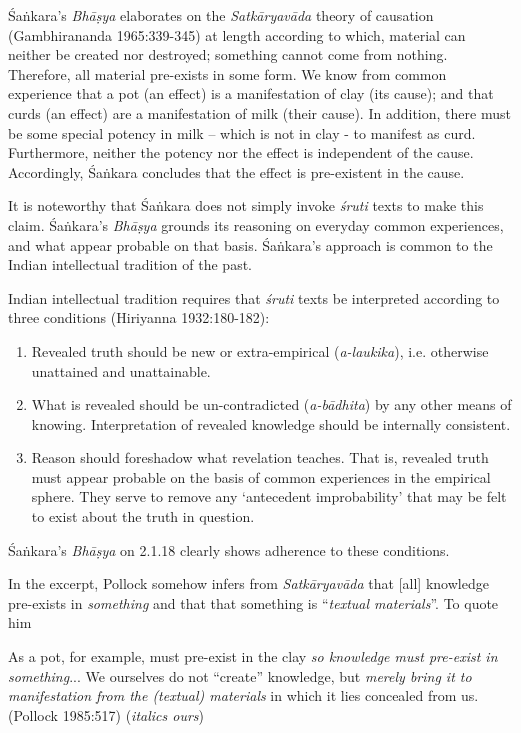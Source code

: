 Śaṅkara's {\sl Bhāṣya} elaborates on the {\sl Satkāryavāda} theory of causation (Gambhirananda 1965:339-345) at length according to which, material can neither be created nor destroyed; something cannot come from nothing. Therefore, all material pre-exists in some form.  We know from common experience that a pot (an effect) is a manifestation of clay (its cause); and that curds (an effect) are a manifestation of milk (their cause). In addition, there must be some special potency in milk -- which is not in clay - to manifest as curd.  Furthermore, neither the potency nor the effect is independent of the cause.  Accordingly, Śaṅkara concludes that the effect is pre-existent in the cause.

It is noteworthy that Śaṅkara does not simply invoke {\sl śruti} texts to make this claim.  Śaṅkara's {\sl Bhāṣya} grounds its reasoning on everyday common experiences, and what appear probable on that basis.  Śaṅkara's approach is common to the Indian intellectual tradition of the past.

Indian intellectual tradition requires that {\sl śruti} texts be interpreted according to three conditions (Hiriyanna 1932:180-182):
\begin{enumerate}
\item Revealed truth should be new or extra-empirical ({\sl a-laukika}), i.e. otherwise unattained and unattainable.

\item What is revealed should be un-contradicted ({\sl a-bādhita}) by any other means of knowing. Interpretation of revealed knowledge should be internally consistent.

\item Reason should foreshadow what revelation teaches. That is, revealed truth must appear probable on the basis of common experiences in the empirical sphere. They serve to remove any `antecedent improbability' that may be felt to exist about the truth in question.
\end{enumerate}

Śaṅkara's {\sl Bhāṣya} on 2.1.18 clearly shows adherence to these conditions.

In the excerpt, Pollock somehow infers from {\sl Satkāryavāda} that [all] knowledge pre-exists in {\sl something} and that that something is ``{\sl textual materials}''. To quote him
\begin{myquote}
As a pot, for example, must pre-exist in the clay {\sl so knowledge must pre-exist in something}... We ourselves do not ``create'' knowledge, but {\sl merely bring it to manifestation from the (textual) materials} in which it lies concealed from us.\hfill (Pollock 1985:517) ({\sl italics ours})
\end{myquote}

